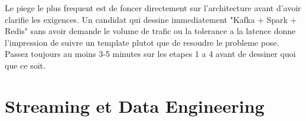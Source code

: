 \documentclass[11pt,a4paper]{article}
\begin{document}
\begin{piege}
Le piege le plus frequent est de foncer directement sur l'architecture avant d'avoir clarifie les exigences. Un candidat qui dessine immediatement "Kafka + Spark + Redis" sans avoir demande le volume de trafic ou la tolerance a la latence donne l'impression de suivre un template plutot que de resoudre le probleme pose. Passez toujours au moins 3-5 minutes sur les etapes 1 a 4 avant de dessiner quoi que ce soit.
\end{piege}

\newpage
\section{Streaming et Data Engineering}
\end{document}
